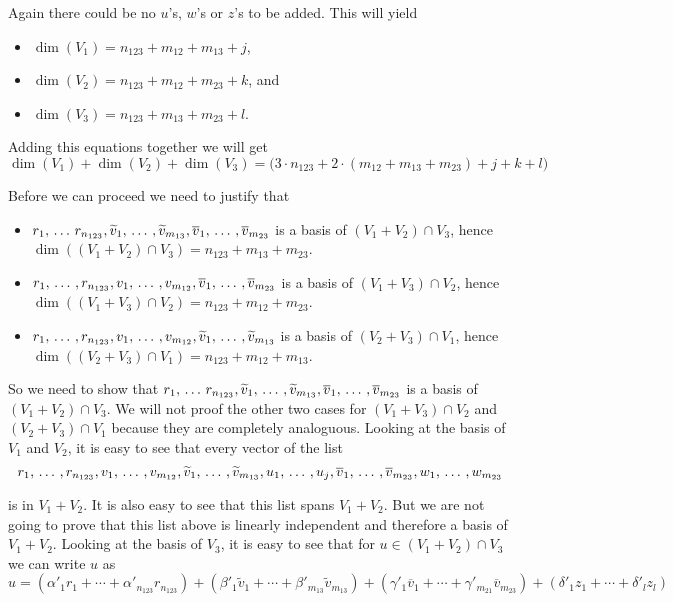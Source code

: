 \begin{xrcs}
Again there could be no $u$'s, $w$'s or $z$'s to be added. This will yield
\begin{itemize}
  \item $\dim (V_1) = n_{123} + m_{12} + m_{13} + j$,
  \item $\dim (V_2) = n_{123} + m_{12} + m_{23} + k$, and
  \item $\dim (V_3) = n_{123} + m_{13} + m_{23} + l$.
\end{itemize}

Adding this equations together we will  get
\begin{equation}
  \label{eq: dim V_1 + dim V_2 + dim V_3}
    \dim (V_1)+ \dim (V_2) + \dim (V_3) = \Big(3 \cdot n_{123} + 2 \cdot (m_{12}+m_{13}+m_{23})+j+k+l \Big)
\end{equation}

Before we can proceed we need to justify that
\begin{itemize}
  \item $r_1,  {\, \ldots \,\,} r_{n_{123}} ,  \widetilde{v}_1, {\, \ldots \,\,}, \widetilde{v}_{m_{13}}, \overline{v}_1, {\, \ldots \,\,}, \overline{v}_{m_{23}}$ is a basis of $(V_1+V_2) \cap V_3$, hence $\dim ((V_1+V_2) \cap V_3) = n_{123} + m_{13}+m_{23}$.
  \item $r_1, {\, \ldots \,\,}, r_{n_{123}}, v_1, {\, \ldots \,\,}, v_{m_{12}}, \overline{v}_1, {\, \ldots \,\,}, \overline{v}_{m_{23}}$ is a basis of $(V_1+V_3) \cap V_2$, hence $\dim ((V_1+V_3) \cap V_2) = n_{123} + m_{12}+m_{23}$.
  \item $r_1, {\, \ldots \,\,}, r_{n_{123}}, v_1, {\, \ldots \,\,}, v_{m_{12}}, \widetilde{v}_1, {\, \ldots \,\,}, \widetilde{v}_{m_{13}}$ is a basis of $(V_2+V_3) \cap V_1$, hence $\dim ((V_2+V_3) \cap V_1) = n_{123} + m_{12}+m_{13}$.
\end{itemize}

So we need to show that $r_1,  {\, \ldots \,\,} r_{n_{123}} ,  \widetilde{v}_1, {\, \ldots \,\,}, \widetilde{v}_{m_{13}}, \overline{v}_1, {\, \ldots \,\,}, \overline{v}_{m_{23}}$ is a basis of $(V_1+V_2) \cap V_3$. We will not proof the other two cases for $(V_1+V_3) \cap V_2$ and $(V_2 + V_3) \cap V_1$ because they are completely analoguous. Looking at the basis of $V_1$ and $V_2$, it is easy to see that every vector of the list
\begin{equation}
  r_1, {\, \ldots \,\,}, r_{n_{123}}, v_1, {\, \ldots \,\,}, v_{m_{12}}, \widetilde{v}_1, {\, \ldots \,\,}, \widetilde{v}_{m_{13}}, u_1, {\, \ldots \,\,}, u_j, \overline{v}_1, {\, \ldots \,\,}, \overline{v}_{m_{23}}, w_1, {\, \ldots \,\,}, w_{m_{23}}
\end{equation}

is in $V_1 + V_2$. It is also easy to see that this list spans $V_1 + V_2$. But we are not going to prove that this list above is linearly independent and therefore a basis of $V_1+V_2$. Looking at the basis of $V_3$, it is easy to see that for $u \in (V_1 + V_2) \cap V_3$ we can write $u$ as
\begin{equation}
  u = (\alpha'_1 r_1+ \cdots+ \alpha'_{n_{123}} r_{n_{123}})
  + (\beta'_1 \widetilde{v}_1+ \cdots+ \beta'_{m_{13}} \widetilde{v}_{m_{13}})
  + (\gamma'_1 \overline{v}_1+ \cdots+ \gamma'_{m_{21}} \overline{v}_{m_{23}})
  + (\delta'_1 z_1+\cdots+ \delta'_l z_l)
\end{equation}


\end{xrcs}
